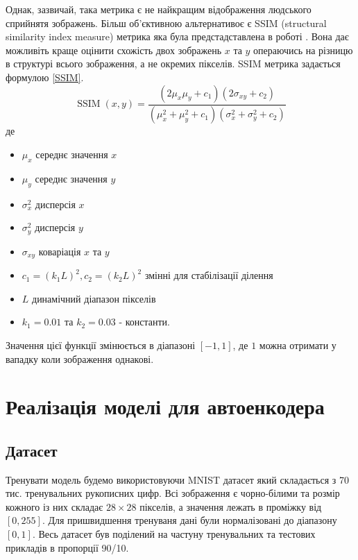 \documentclass[14pt,a4paper]{extarticle}
\newcounter{e}
\numberwithin{equation}{section}
\numberwithin{figure}{section}
\begin{document}
	Однак, зазвичай, така метрика є не найкращим відображення людського сприйнятя зображень. Більш об'єктивною альтернативоє є SSIM (structural similarity index measure) метрика яка була предстадставлена в роботі \cite{1284395}. Вона дає можливіть краще оцінити схожість двох зображень $x$ та $y$ операючись на різницю в структурі всього зображення, а не окремих пікселів. SSIM метрика задається формулою \ref{SSIM}.
	\begin{equation}
		\label{SSIM}
		\operatorname{SSIM}(x, y)=\frac{\left(2 \mu_{x} \mu_{y}+c_{1}\right)\left(2 \sigma_{x 	y}+c_{2}\right)}{\left(\mu_{x}^{2}+\mu_{y}^{2}+c_{1}\right)\left(\sigma_{x}^{2}+\sigma_{y}^{2}+c_{2}\right)}
	\end{equation}
	де
	\begin{itemize}
		\item $\mu_{x}$ середнє значення $x$
		\item $\mu_{y}$ середнє значення $y$
		\item $\sigma_{x}^{2}$ дисперсія $x$
		\item $\sigma_{y}^{2}$ дисперсія  $y$
		\item $\sigma_{x y}$ коваріація $x$ та $y$
		\item $c_{1}=\left(k_{1} L\right)^{2}, c_{2}=\left(k_{2} L\right)^{2}$ змінні для стабілізації ділення
		\item $L$ динамічний діапазон пікселів
		\item $k_{1}=0.01$ та $k_{2}=0.03$ - константи.	
	\end{itemize}
	
	Значення цієї функції змінюється в діапазоні $[-1, 1]$, де $1$ можна отримати у вападку коли зображення однакові.
	
	

	\newpage
	\thispagestyle{empty}
	\section{Реалізація моделі для автоенкодера}
	
	\subsection{Датасет}

	Тренувати модель будемо використовуючи MNIST датасет який складається з 70 тис. тренувальних рукописних цифр. Всі зображення є чорно-білими та розмір кожного із них складає $28 \times 28$ пікселів, а значення лежать в проміжку від $[0,255]$. Для пришвидшення тренуваня дані  були нормалізовані до діапазону $[0, 1]$. Весь датасет був поділений на частуну тренувальних та тестових прикладів в пропорції 90/10.
	
\end{document}
